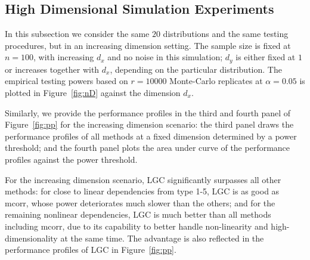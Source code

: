 \documentclass[11pt]{article}
\begin{document}
\subsection{High Dimensional Simulation Experiments}
\label{numer2}
In this subsection we consider the same $20$ distributions and the same testing procedures, but in an increasing dimension setting. The sample size is fixed at $n=100$, with increasing $d_{x}$ and no noise in this simulation; $d_{y}$ is either fixed at $1$ or increases together with $d_{x}$, depending on the particular distribution. The empirical testing powers based on $r=10000$ Monte-Carlo replicates at $\alpha=0.05$ is plotted in Figure~\ref{fig:nD} against the dimension $d_{x}$.

Similarly, we provide the performance profiles in the third and fourth panel of Figure~\ref{fig:pp} for the increasing dimension scenario: the third panel draws the performance profiles of all methods at a fixed dimension determined by a power threshold; and the fourth panel plots the area under curve of the performance profiles against the power threshold.

For the increasing dimension scenario, LGC significantly surpasses all other methods: for close to linear dependencies from type 1-5, LGC is as good as mcorr, whose power deteriorates much slower than the others; and for the remaining nonlinear dependencies, LGC is much better than all methods including mcorr, due to its capability to better handle non-linearity and high-dimensionality at the same time. The advantage is also reflected in the performance profiles of LGC in Figure~\ref{fig:pp}. %
\end{document}
